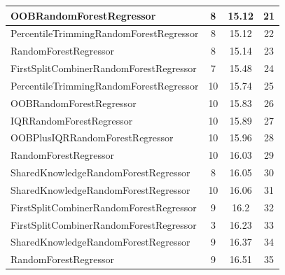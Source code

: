 \begin{table}[h]
\begin{tabular}{|l|c|c|c|}
\textcolor[HTML]{b33dc6}{OOBRandomForestRegressor} & 8 & 15.12 & 21 \\ \hline
\textcolor[HTML]{f46a9b}{PercentileTrimmingRandomForestRegressor} & 8 & 15.12 & 22 \\ \hline
\textcolor[HTML]{87bc45}{RandomForestRegressor} & 8 & 15.14 & 23 \\ \hline
\textcolor[HTML]{ea5545}{FirstSplitCombinerRandomForestRegressor} & 7 & 15.48 & 24 \\ \hline
\textcolor[HTML]{f46a9b}{PercentileTrimmingRandomForestRegressor} & 10 & 15.74 & 25 \\ \hline
\textcolor[HTML]{b33dc6}{OOBRandomForestRegressor} & 10 & 15.83 & 26 \\ \hline
\textcolor[HTML]{27aeef}{IQRRandomForestRegressor} & 10 & 15.89 & 27 \\ \hline
\textcolor[HTML]{ede15b}{OOBPlusIQRRandomForestRegressor} & 10 & 15.96 & 28 \\ \hline
\textcolor[HTML]{87bc45}{RandomForestRegressor} & 10 & 16.03 & 29 \\ \hline
\textcolor[HTML]{ef9b20}{SharedKnowledgeRandomForestRegressor} & 8 & 16.05 & 30 \\ \hline
\textcolor[HTML]{ef9b20}{SharedKnowledgeRandomForestRegressor} & 10 & 16.06 & 31 \\ \hline
\textcolor[HTML]{ea5545}{FirstSplitCombinerRandomForestRegressor} & 9 & 16.2 & 32 \\ \hline
\textcolor[HTML]{ea5545}{FirstSplitCombinerRandomForestRegressor} & 3 & 16.23 & 33 \\ \hline
\textcolor[HTML]{ef9b20}{SharedKnowledgeRandomForestRegressor} & 9 & 16.37 & 34 \\ \hline
\textcolor[HTML]{87bc45}{RandomForestRegressor} & 9 & 16.51 & 35 \\ \hline
\end{tabular}
\end{table}

